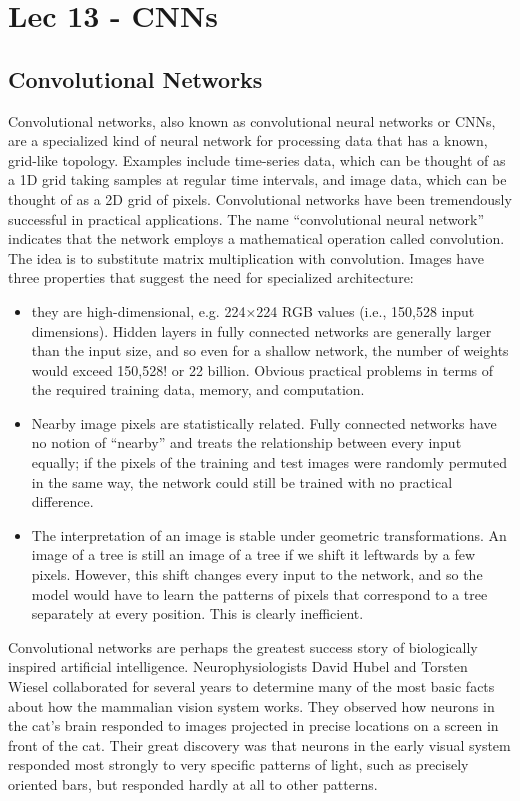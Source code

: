 \chapter{Lec 13 - CNNs}

\section{Convolutional Networks}
Convolutional networks, also known as convolutional neural networks or CNNs, are a specialized kind of neural network for processing data that has a known, grid-like topology. Examples include time-series data, which can be thought of as a 1D grid taking samples at regular time intervals, and image data, which can be thought of as a 2D grid of pixels. Convolutional networks have been tremendously successful in practical applications. The name “convolutional neural network” indicates that the network employs a mathematical operation called convolution. The idea is to substitute matrix multiplication with convolution.\newline\newline
Images have three properties that suggest the need for specialized architecture:
\begin{itemize}
    \item they are high-dimensional, e.g. 224×224 RGB values (i.e., 150,528 input dimensions). Hidden layers in fully connected networks are generally larger than the input size, and so even for a shallow network, the number of weights would exceed 150,528! or 22 billion. Obvious practical problems in terms of the required training data, memory, and computation.

    \item Nearby image pixels are statistically related. Fully connected networks have no notion of “nearby” and treats the relationship between every input equally; if the pixels of the training and test images were randomly permuted in the same way, the network could still be trained with no practical difference.

    \item The interpretation of an image is stable under geometric transformations. An image of a tree is still an image of a tree if we shift it leftwards by a few pixels. However, this shift changes every input to the network, and so the model would have to learn the patterns of pixels that correspond to a tree separately at every position. This is clearly inefficient.
\end{itemize}
Convolutional networks are perhaps the greatest success story of biologically
inspired artificial intelligence. Neurophysiologists
David Hubel and Torsten Wiesel collaborated for several years to determine many of the most basic facts about how the mammalian vision system works. They observed how neurons in the cat’s brain responded to images projected
in precise locations on a screen in front of the cat. Their great discovery was that neurons in the early visual system responded most strongly to very specific patterns of light, such as precisely oriented bars, but responded hardly at all to other patterns.

